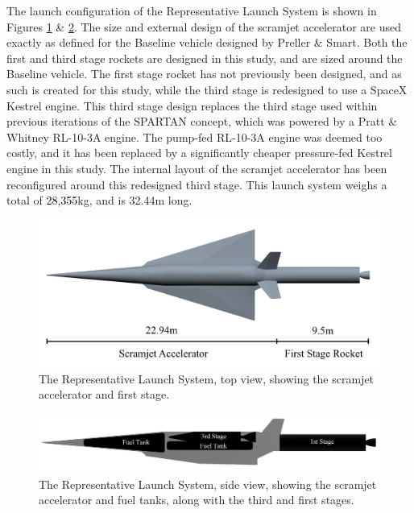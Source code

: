 	 The launch configuration of the Representative Launch System is shown in Figures \ref{fig:NoInternal} \& \ref{fig:INTERNALS}. 
	 The size and external design of the scramjet accelerator are used exactly as defined for the Baseline vehicle designed by Preller \& Smart\cite{Preller2017b}. Both the first and third stage rockets are designed in this study, and are sized around the Baseline vehicle. 
	 The first stage rocket has not previously been designed, and as such is created for this study, while the third stage is redesigned to use a SpaceX Kestrel engine. This third stage design replaces the third stage used within previous iterations of the SPARTAN concept, which was powered by a Pratt \& Whitney RL-10-3A engine\cite{Preller2017b}. The pump-fed RL-10-3A engine was deemed too costly, and it has been replaced by a significantly cheaper pressure-fed Kestrel engine in this study.  
	 The internal layout of the scramjet accelerator has been reconfigured around this redesigned third stage. 
	 This launch system weighs a total of \textcolor{black}{28,355}kg, and is 32.44m long. 
	 \begin{figure}[ht]
	 	\centering
	 	\includegraphics[width=0.85\linewidth]{figures/3_vehicle_design/NoInternal}
	 	\caption{The Representative Launch System, top view, showing the scramjet accelerator and first stage. }
	 	\label{fig:NoInternal}
	 \end{figure}
	 \begin{figure}[ht]
	 	\centering
	 	\includegraphics[width=0.85\linewidth]{figures/3_vehicle_design/INTERNALS}
	 	\caption{The Representative Launch System, side view, showing the scramjet accelerator and fuel tanks, along with the third and first stages. }
	 	\label{fig:INTERNALS}
	 \end{figure}


